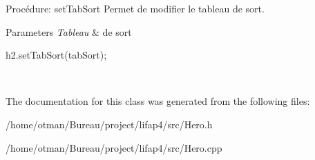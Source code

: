 Procédure\+: set\+Tab\+Sort Permet de modifier le tableau de sort. 


\begin{DoxyParams}{Parameters}
{\em Tableau} & de sort 
\begin{DoxyCode}
h2.setTabSort(tabSort);
\end{DoxyCode}
 \\
\hline
\end{DoxyParams}


The documentation for this class was generated from the following files\+:\begin{DoxyCompactItemize}
\item 
/home/otman/\+Bureau/project/lifap4/src/Hero.\+h\item 
/home/otman/\+Bureau/project/lifap4/src/Hero.\+cpp\end{DoxyCompactItemize}

